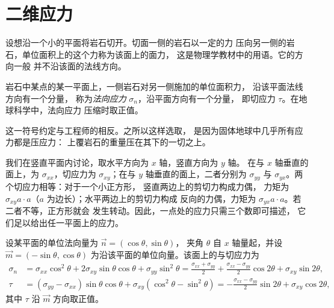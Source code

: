 \section{二维应力}\label{sec:b1:stress-strain-rheology:stress}

设想沿一个小的平面将岩石切开。切面一侧的岩石以一定的力
压向另一侧的岩石，单位面积上的这个力称为该面上的面力，
这是物理学教材中的用语。它的方向一般
并不沿该面的法线方向。

\begin{definition}[法向应力]\label{def:b1:stress-strain-rheology:stress}
岩石中某点的某一平面上，一侧岩石对另一侧施加的单位面积力，
沿该平面法线方向有一个分量，
称为\emph{法向应力} $\sigma_n$，沿平面方向有一个分量，
即切应力 $\tau$。在地球科学中，法向应力
压缩时取正值。
\end{definition}

这一符号约定与工程师的相反。之所以这样选取，
是因为固体地球中几乎所有应力都是压应力：
上覆岩石的重量压在其下的一切之上。

我们在竖直平面内讨论，取水平方向为 $x$ 轴，竖直方向为 $y$ 轴。
在与 $x$ 轴垂直的面上，为 $\sigma_{xx}$，切应力为
$\sigma_{xy}$；在与 $y$ 轴垂直的面上，二者分别为 $\sigma_{yy}$
与 $\sigma_{yx}$。两个切应力相等：对于一个小正方形，
竖直两边上的剪切力构成力偶，
力矩为 $\sigma_{xy}a\cdot a$（$a$ 为边长）；水平两边上的剪切力构成
反向的力偶，力矩为 $\sigma_{yx}a\cdot a$。若二者不等，正方形就会
发生转动。因此，一点处的应力只需三个数即可描述，
它们足以给出任一平面上的应力。

\begin{proposition}[斜面上的应力]\label{prop:b1:stress-strain-rheology:transformation}
设某平面的单位法向量为 $\vec n = (\cos\theta, \sin\theta)$，
夹角 $\theta$ 自 $x$ 轴量起，并设 $\vec m = (-\sin\theta, \cos\theta)$
为沿该平面的单位向量。该面上的与切应力为
\begin{align*}
  \sigma_n &= \sigma_{xx}\cos^2\theta + 2\sigma_{xy}\sin\theta\cos\theta + \sigma_{yy}\sin^2\theta
           = \frac{\sigma_{xx}+\sigma_{yy}}{2} + \frac{\sigma_{xx}-\sigma_{yy}}{2}\cos2\theta + \sigma_{xy}\sin2\theta, \\
  \tau     &= (\sigma_{yy}-\sigma_{xx})\sin\theta\cos\theta + \sigma_{xy}(\cos^2\theta - \sin^2\theta)
           = -\frac{\sigma_{xx}-\sigma_{yy}}{2}\sin2\theta + \sigma_{xy}\cos2\theta ,
\end{align*}
其中 $\tau$ 沿 $\vec m$ 方向取正值。
\end{proposition}


